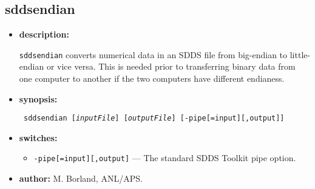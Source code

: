 \newpage
\subsection{sddsendian}
\label{sddsendian}

\begin{itemize}
\item {\bf description:}

\verb|sddsendian| converts numerical data in an SDDS file from
big-endian to little-endian or vice versa.  This is needed prior to
transferring binary data from one computer to another if the two
computers have different endianess.

\item {\bf synopsis:} 
\begin{flushleft}{\tt
sddsendian [{\em inputFile}] [{\em outputFile}] [-pipe[=input][,output]]
}\end{flushleft}

\item {\bf switches:} 
\begin{itemize}
        \item {\tt -pipe[=input][,output]} --- The standard SDDS Toolkit pipe option.
\end{itemize}

\item {\bf author:} M. Borland, ANL/APS.
\end{itemize}



